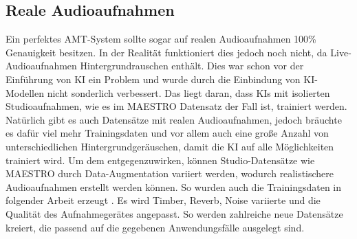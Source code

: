 \subsection{Reale Audioaufnahmen}
Ein perfektes AMT-System sollte sogar auf realen Audioaufnahmen 100\% Genauigkeit besitzen.
In der Realität funktioniert dies jedoch noch nicht, da Live-Audioaufnahmen Hintergrundrauschen enthält.
Dies war schon vor der Einführung von KI ein Problem und wurde durch die Einbindung
von KI-Modellen nicht sonderlich verbessert.
Das liegt daran, dass KIs mit isolierten Studioaufnahmen, wie es im MAESTRO Datensatz der Fall ist, trainiert werden.
Natürlich gibt es auch Datensätze mit realen Audioaufnahmen, jedoch bräuchte es dafür viel mehr Trainingsdaten und
vor allem auch eine große Anzahl von unterschiedlichen Hintergrundgeräuschen,
damit die KI auf alle Möglichkeiten trainiert wird.
Um dem entgegenzuwirken, können Studio-Datensätze wie MAESTRO durch Data-Augmentation variiert werden,
wodurch realistischere Audioaufnahmen erstellt werden können.
So wurden auch die Trainingsdaten in folgender Arbeit erzeugt .
Es wird Timber, Reverb, Noise variierte und die Qualität des Aufnahmegerätes angepasst.
So werden zahlreiche neue Datensätze kreiert, die passend auf die gegebenen Anwendungsfälle ausgelegt sind.

